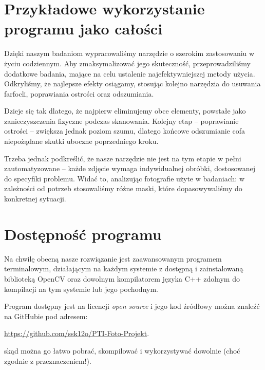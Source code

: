 \documentclass[]{mwart}
\begin{document}
\newpage
\section{Przykładowe wykorzystanie programu jako całości}
Dzięki naszym badaniom wypracowaliśmy narzędzie o szerokim zastosowaniu w życiu codziennym.
Aby zmaksymalizować jego skuteczność, przeprowadziliśmy dodatkowe badania,
mające na celu ustalenie najefektywniejszej metody użycia. Odkryliśmy, że najlepsze efekty osiągamy,
stosując kolejno narzędzia do usuwania farfocli, poprawiania ostrości oraz odszumiania.

Dzieje się tak dlatego, że najpierw eliminujemy obce elementy,
powstałe jako zanieczyszczenia fizyczne podczas skanowania.
Kolejny etap -- poprawianie ostrości -- zwiększa jednak poziom szumu,
dlatego końcowe odszumianie cofa niepożądane skutki uboczne poprzedniego kroku.

Trzeba jednak podkreślić, że nasze narzędzie nie jest na tym etapie w pełni zautomatyzowane
-- każde zdjęcie wymaga indywidualnej obróbki, dostosowanej do specyfiki problemu.
Widać to, analizując fotografie użyte w badaniach: w zależności od potrzeb stosowaliśmy różne maski,
które dopasowywaliśmy do konkretnej sytuacji.




\section{Dostępność programu}
Na chwilę obecną nasze rozwiązanie jest zaawansowanym programem terminalowym,
działającym na każdym systemie z dostępną i zainstalowaną biblioteką OpenCV oraz
dowolnym kompilatorem języka C++ zdolnym do kompilacji na tym systemie lub jego pochodnym.

Program dostępny jest na licencji \textit{open source} i jego kod źródłowy można znaleźć na GitHubie
pod adresem:
\begin{center}
    \url{https://github.com/ssk12o/PTI-Foto-Projekt}.
\end{center}
skąd można go łatwo pobrać, skompilować i wykorzystywać dowolnie (choć zgodnie z przeznaczeniem!).




\newpage
\end{document}
